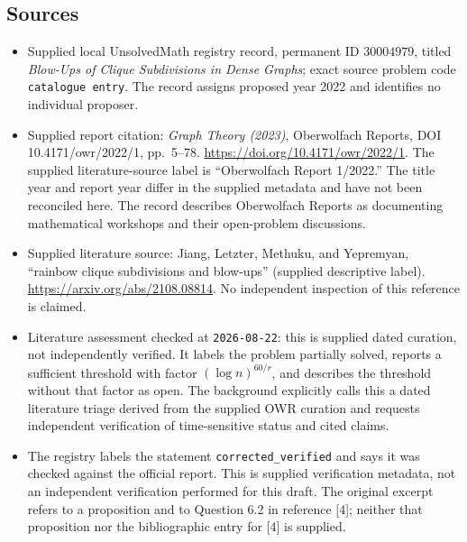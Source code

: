 \documentclass[11pt]{article}
\begin{document}
\subsection{Sources}
\begin{itemize}
\item Supplied local UnsolvedMath registry record, permanent ID \(30004979\), titled \emph{Blow-Ups of Clique Subdivisions in Dense Graphs}; exact source problem code \texttt{catalogue entry}. The record assigns proposed year 2022 and identifies no individual proposer.
\item Supplied report citation: \emph{Graph Theory (2023)}, Oberwolfach Reports, DOI 10.4171/owr/2022/1, pp.~5--78. \url{https://doi.org/10.4171/owr/2022/1}. The supplied literature-source label is ``Oberwolfach Report 1/2022.'' The title year and report year differ in the supplied metadata and have not been reconciled here. The record describes Oberwolfach Reports as documenting mathematical workshops and their open-problem discussions.
\item Supplied literature source: Jiang, Letzter, Methuku, and Yepremyan, ``rainbow clique subdivisions and blow-ups'' (supplied descriptive label). \url{https://arxiv.org/abs/2108.08814}. No independent inspection of this reference is claimed.
\item Literature assessment checked at \texttt{2026-08-22}: this is supplied dated curation, not independently verified. It labels the problem partially solved, reports a sufficient threshold with factor \((\log n)^{60/r}\), and describes the threshold without that factor as open. The background explicitly calls this a dated literature triage derived from the supplied OWR curation and requests independent verification of time-sensitive status and cited claims.
\item The registry labels the statement \texttt{corrected\_verified} and says it was checked against the official report. This is supplied verification metadata, not an independent verification performed for this draft. The original excerpt refers to a proposition and to Question 6.2 in reference [4]; neither that proposition nor the bibliographic entry for [4] is supplied.
\end{itemize}
\end{document}
